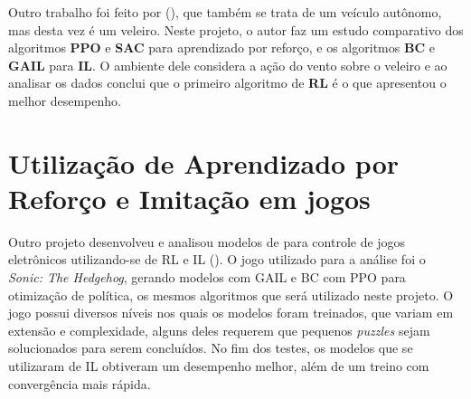 Outro trabalho foi feito por (), que também se trata de um veículo autônomo, mas desta vez é um veleiro. Neste projeto, o autor faz um estudo comparativo dos algoritmos \textbf{PPO} e \textbf{SAC} para aprendizado por reforço, e os algoritmos \textbf{BC} e \textbf{GAIL} para \textbf{IL}. O ambiente dele considera a ação do vento sobre o veleiro e ao analisar os dados conclui que o primeiro algoritmo de \textbf{RL} é o que apresentou o melhor desempenho.

\section*{Utilização de Aprendizado por Reforço e Imitação em jogos}
Outro projeto desenvolveu e analisou modelos de para controle de jogos eletrônicos utilizando-se de RL e IL (). O jogo utilizado para a análise foi o \textit{Sonic: The Hedgehog}, gerando modelos com GAIL e BC com PPO para otimização de política, os mesmos algoritmos que será utilizado neste projeto. O jogo possui diversos níveis nos quais os modelos foram treinados, que variam em extensão e complexidade, alguns deles requerem que pequenos \textit{puzzles} sejam solucionados para serem concluídos. No fim dos testes, os modelos que se utilizaram de IL obtiveram um desempenho melhor, além de um treino com convergência mais rápida.
